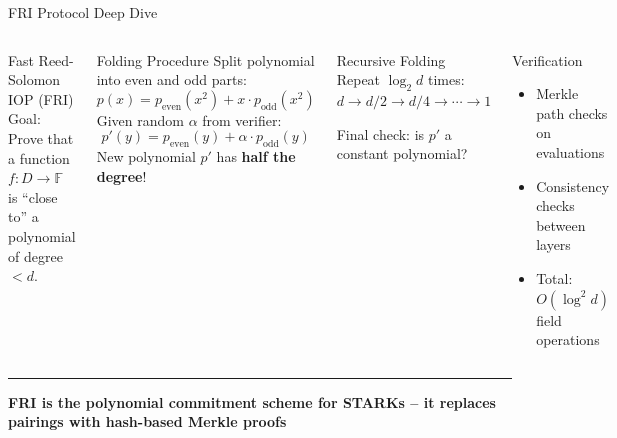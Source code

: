 \documentclass[8pt,aspectratio=169]{beamer}
\newcommand{\bottomnote}[1]{\vfill\vspace{-2mm}\textcolor{mllavender2}{\rule{\textwidth}{0.4pt}}\vspace{1mm}\footnotesize\textbf{#1}}
\begin{document}
\begin{frame}{FRI Protocol Deep Dive}
\begin{columns}[T]
\begin{block}{Fast Reed-Solomon IOP (FRI)}
\footnotesize
Goal: Prove that a function $f: D \rightarrow \mathbb{F}$ is ``close to'' a polynomial of degree $< d$.
\end{block}
\vspace{1mm}
\begin{block}{Folding Procedure}
\footnotesize
Split polynomial into even and odd parts:
\[
p(x) = p_{\text{even}}(x^2) + x \cdot p_{\text{odd}}(x^2)
\]
Given random $\alpha$ from verifier:
\[
p'(y) = p_{\text{even}}(y) + \alpha \cdot p_{\text{odd}}(y)
\]
New polynomial $p'$ has \textbf{half the degree}!
\end{block}
\vspace{1mm}
\begin{exampleblock}{\footnotesize Recursive Folding}
\footnotesize
Repeat $\log_2 d$ times: $d \rightarrow d/2 \rightarrow d/4 \rightarrow \cdots \rightarrow 1$

Final check: is $p'$ a constant polynomial?
\end{exampleblock}

\vspace{2mm}
\begin{block}{Verification}
\footnotesize
\begin{itemize}
  \item Merkle path checks on evaluations
  \item Consistency checks between layers
  \item Total: $O(\log^2 d)$ field operations
\end{itemize}
\end{block}
\end{columns}
\bottomnote{FRI is the polynomial commitment scheme for STARKs -- it replaces pairings with hash-based Merkle proofs}
\end{frame}
\end{document}
